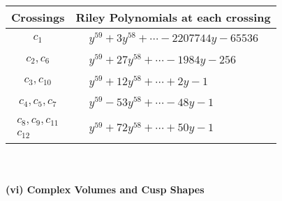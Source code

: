 \documentclass[1p]{elsarticle_modified}
\theoremstyle{definition}
\begin{document}
\begin{tabular}{m{50pt}|m{274pt}}
Crossings & \hspace{64pt}Riley Polynomials at each crossing \\
\hline $$\begin{aligned}c_{1}\end{aligned}$$&$\begin{aligned}
&y^{59}+3 y^{58}+\cdots-2207744 y-65536
\end{aligned}$\\
\hline $$\begin{aligned}c_{2},c_{6}\end{aligned}$$&$\begin{aligned}
&y^{59}+27 y^{58}+\cdots-1984 y-256
\end{aligned}$\\
\hline $$\begin{aligned}c_{3},c_{10}\end{aligned}$$&$\begin{aligned}
&y^{59}+12 y^{58}+\cdots+2 y-1
\end{aligned}$\\
\hline $$\begin{aligned}c_{4},c_{5},c_{7}\end{aligned}$$&$\begin{aligned}
&y^{59}-53 y^{58}+\cdots-48 y-1
\end{aligned}$\\
\hline $$\begin{aligned}c_{8},c_{9},c_{11}\\c_{12}\end{aligned}$$&$\begin{aligned}
&y^{59}+72 y^{58}+\cdots+50 y-1
\end{aligned}$\\
\hline
\end{tabular}\\~\\
\newpage\flushleft \textbf{(vi) Complex Volumes and Cusp Shapes}
\end{document}
